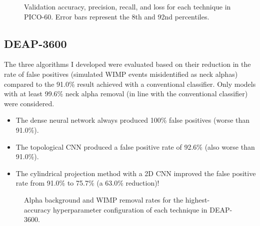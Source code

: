\documentclass[12pt]{article}
\begin{document}
\begin{figure}[ht]
    \centering
    \caption{Validation accuracy, precision, recall, and loss for each technique in PICO-60. Error bars represent the 8th and 92nd percentiles.}
\end{figure}

\subsection{DEAP-3600}

The three algorithms I developed were evaluated based on their reduction in the rate of false positives (simulated WIMP events misidentified as neck alphas) compared to the 91.0\% result achieved with a conventional classifier. Only models with at least 99.6\% neck alpha removal (in line with the conventional classifier) were considered.

\begin{itemize}
    \item The dense neural network always produced 100\% false positives (worse than 91.0\%).
    \item The topological CNN produced a false positive rate of 92.6\% (also worse than 91.0\%).
    \item The cylindrical projection method with a 2D CNN improved the false positive rate from 91.0\% to 75.7\% (a 63.0\% reduction)!
\end{itemize}

\begin{figure}[ht]
    \centering
    \caption{Alpha background and WIMP removal rates for the highest-accuracy hyperparameter configuration of each technique in DEAP-3600.}
\end{figure}
\end{document}
